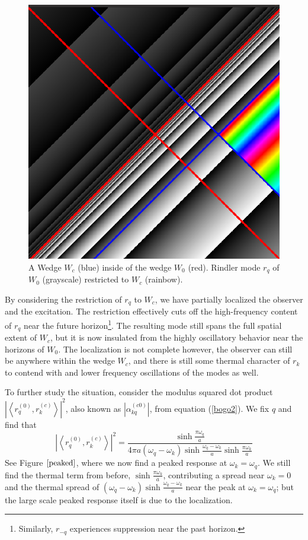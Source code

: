 \documentclass[12pt,a4paper]{article}
\begin{document}
\begin{figure}[h]
  \centering
\includegraphics[scale=0.3]{wedge_in_wedge.png}
\caption{A Wedge $W_c$ (blue) inside of the wedge $W_0$ (red). Rindler mode $r_q$ of $W_0$ (grayscale) restricted to $W_c$ (rainbow).}
\label{restrict}
\end{figure}

By considering the restriction of $r_q$ to $W_c$, we have partially localized the observer and the excitation. The restriction effectively cuts off the high-frequency content of $r_q$ near the future horizon\footnote{Similarly, $r_{-q}$ experiences suppression near the past horizon.}. The resulting mode still spans the full spatial extent of $W_c$, but it is now insulated from the highly oscillatory behavior near the horizons of $W_0$.  The localization is not complete however, the observer can still be anywhere within the wedge $W_c$, and there is still some thermal character of $r_k$ to contend with and lower frequency oscillations of the modes as well.

To further study the situation, consider the modulus squared dot product $\left|\left<r_q^{(0)}, r_k^{(c)} \right>\right|^2$, also known as $\left|\alpha^{(c0)}_{kq}\right|$, from equation (\ref{bogo2}).  We fix $q$ and find that
\begin{equation}
  \left|\left<r_q^{(0)}, r_k^{(c)} \right>\right|^2 = \frac{\sinh \frac{\pi \omega_q}{a}}{4\pi a (\omega_q - \omega_k) \sinh \frac{\omega_q - \omega_k}{a} \sinh \frac{\pi \omega_k}{a}}
\end{equation}
See Figure $\ref{peaked}$, where we now find a peaked response at $\omega_k = \omega_q$.  We still find the thermal term from before, $\sinh \frac{\pi \omega_k}{a}$, contributing a spread near $\omega_k = 0$ and the thermal spread of $(\omega_q - \omega_k) \sinh \frac{\omega_q - \omega_k}{a}$ near the peak at $\omega_k = \omega_q$; but the large scale peaked response itself is due to the localization.
\end{document}
